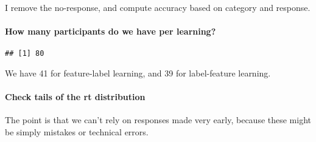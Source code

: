 \documentclass[
]{article}
\newenvironment{Shaded}{\begin{snugshade}}{\end{snugshade}}
\newcommand{\DataTypeTok}[1]{\textcolor[rgb]{0.13,0.29,0.53}{#1}}
\newcommand{\DecValTok}[1]{\textcolor[rgb]{0.00,0.00,0.81}{#1}}
\newcommand{\KeywordTok}[1]{\textcolor[rgb]{0.13,0.29,0.53}{\textbf{#1}}}
\newcommand{\NormalTok}[1]{#1}
\newcommand{\OperatorTok}[1]{\textcolor[rgb]{0.81,0.36,0.00}{\textbf{#1}}}
\newcommand{\StringTok}[1]{\textcolor[rgb]{0.31,0.60,0.02}{#1}}
\begin{document}
I remove the no-response, and compute accuracy based on category and
response.

\hypertarget{how-many-participants-do-we-have-per-learning}{%
\paragraph{How many participants do we have per
learning?}\label{how-many-participants-do-we-have-per-learning}}

\begin{Shaded}
\end{Shaded}

\begin{verbatim}
## [1] 80
\end{verbatim}

\begin{Shaded}
\end{Shaded}

We have 41 for feature-label learning, and 39 for label-feature
learning.

\hypertarget{check-tails-of-the-rt-distribution}{%
\paragraph{Check tails of the rt
distribution}\label{check-tails-of-the-rt-distribution}}

The point is that we can't rely on responses made very early, because
these might be simply mistakes or technical errors.

\begin{Shaded}
\end{Shaded}
\end{document}
